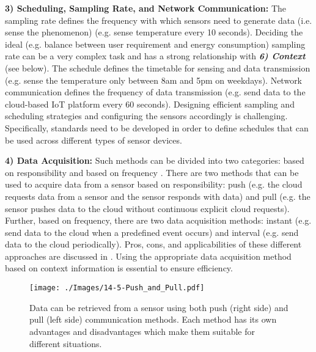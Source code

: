 \documentclass[graybox]{svmult}
\begin{document}
\textbf{3) Scheduling, Sampling Rate, and Network Communication:} The sampling rate defines the frequency with which sensors need to generate data (i.e. sense the phenomenon) (e.g. sense temperature every 10 seconds). Deciding the ideal (e.g. balance between user requirement and energy consumption) sampling rate can be a very complex task and has a strong relationship with \textbf{\textit{6) Context}} (see below). The schedule defines the timetable for sensing and data transmission (e.g. sense the temperature only between 8am and 5pm on weekdays). Network communication defines the frequency of data transmission (e.g. send data to the cloud-based IoT platform every 60 seconds). Designing efficient sampling and scheduling strategies and configuring the sensors accordingly is challenging. Specifically, standards need to be developed in order to define schedules that can be used across different types of sensor devices.



\textbf{4) Data Acquisition:} Such methods can be divided into two categories: based on responsibility and based on frequency  \cite{ZMP007}. There are two methods that can be used to acquire data from a sensor based on responsibility: push (e.g. the cloud requests data from a sensor and the sensor responds with data) and pull (e.g. the sensor pushes data to the cloud without continuous explicit cloud requests). Further, based on frequency, there are two data acquisition methods: instant (e.g. send data to the cloud when a predefined event occurs) and interval (e.g. send data to the cloud periodically). Pros, cons, and applicabilities of these different approaches are discussed in \cite{ZMP007}. Using the appropriate data acquisition method based on context information is essential to ensure efficiency.


\begin{figure}[h]
 \centering
\texttt{[image: ./Images/14-5-Push\_and\_Pull.pdf]}
\caption{Data can be retrieved from a sensor using both push (right side) and pull (left side) communication methods. Each method has its own advantages and disadvantages which make them suitable for different situations.}
 \label{Figure:Push_and_Pull}
\end{figure}
\end{document}
